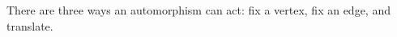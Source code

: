 \documentclass[preview]{standalone}
\begin{document}
There are three ways an automorphism can act: fix a vertex, fix an edge, and translate.\\
\end{document}
